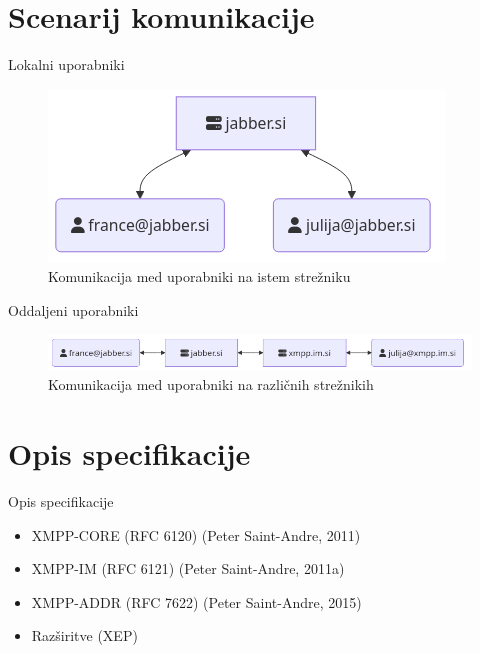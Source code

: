 \documentclass[presentation]{beamer}
\begin{document}
\section{Scenarij komunikacije}
\label{sec:orge62d1c7}

\begin{frame}[label={sec:org328600d}]{Lokalni uporabniki}
\begin{figure}[H]
\centering
\includegraphics[width=.9\linewidth]{images/local-server.png}
\caption{\label{fig:org5c217f1}Komunikacija med uporabniki na istem strežniku}
\end{figure}
\end{frame}

\begin{frame}[label={sec:org66b6f6d}]{Oddaljeni uporabniki}
\begin{figure}[H]
\centering
\includegraphics[width=.9\linewidth]{images/cross-server.png}
\caption{\label{fig:orgb4d1c67}Komunikacija med uporabniki na različnih strežnikih}
\end{figure}
\end{frame}

\section{Opis specifikacije}
\label{sec:orgf9f5e0d}

\begin{frame}[label={sec:org0a7019a}]{Opis specifikacije}
\begin{itemize}
\item XMPP-CORE (RFC 6120) (Peter Saint-Andre, 2011)
\item XMPP-IM (RFC 6121) (Peter Saint-Andre, 2011a)
\item XMPP-ADDR (RFC 7622) (Peter Saint-Andre, 2015)
\item Razširitve (XEP)
\end{itemize}
\end{frame}
\end{document}
